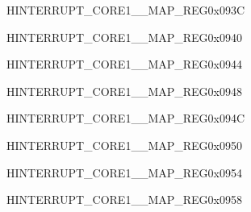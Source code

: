 \begin{register}{H}{INTERRUPT\_CORE1\_\_MAP\_REG}{0x093C}\label{regdesc:INTERRUPTCORE1DMAAPBPERIPMSMONITORVIOLATEINTRMAPREG}
\end{register}
\vspace{-3em}

\begin{register}{H}{INTERRUPT\_CORE1\_\_MAP\_REG}{0x0940}\label{regdesc:INTERRUPTCORE1CORE0IRAM0PMSMONITORVIOLATEINTRMAPREG}
\end{register}
\vspace{-3em}

\begin{register}{H}{INTERRUPT\_CORE1\_\_MAP\_REG}{0x0944}\label{regdesc:INTERRUPTCORE1CORE0DRAM0PMSMONITORVIOLATEINTRMAPREG}
\end{register}
\vspace{-3em}

\begin{register}{H}{INTERRUPT\_CORE1\_\_MAP\_REG}{0x0948}\label{regdesc:INTERRUPTCORE1CORE0PIFPMSMONITORVIOLATEINTRMAPREG}
\end{register}
\vspace{-3em}

\begin{register}{H}{INTERRUPT\_CORE1\_\_MAP\_REG}{0x094C}\label{regdesc:INTERRUPTCORE1CORE0PIFPMSMONITORVIOLATESIZEINTRMAPREG}
\end{register}
\vspace{-3em}

\begin{register}{H}{INTERRUPT\_CORE1\_\_MAP\_REG}{0x0950}\label{regdesc:INTERRUPTCORE1CORE1IRAM0PMSMONITORVIOLATEINTRMAPREG}
\end{register}
\vspace{-3em}

\begin{register}{H}{INTERRUPT\_CORE1\_\_MAP\_REG}{0x0954}\label{regdesc:INTERRUPTCORE1CORE1DRAM0PMSMONITORVIOLATEINTRMAPREG}
\end{register}
\vspace{-3em}

\begin{register}{H}{INTERRUPT\_CORE1\_\_MAP\_REG}{0x0958}\label{regdesc:INTERRUPTCORE1CORE1PIFPMSMONITORVIOLATEINTRMAPREG}
\end{register}
\vspace{-3em}

